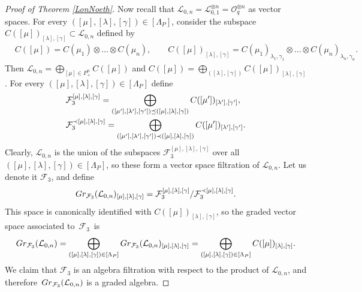 \documentclass[11pt]{article}
\numberwithin{equation}{section}
\numberwithin{equation}{section}
\theoremstyle{definition}
\newcommand{\Ll}{{\mathcal L}}
\begin{document}
\begin{proof}[Proof of Theorem \ref{LonNoeth}]
Now recall that $\Ll_{0,n} = {\mathcal L}_{0,1}^{\otimes n} = {\mathcal O}_q^{\otimes n}$ as vector spaces. For every $([\mu],[\lambda],[\gamma])\in[\Lambda_P]$, consider the subspace $C([\mu])_{[\lambda],[\gamma]}\subset \Ll_{0,n}$ defined by
\begin{align*}
&C([\mu]) =C(\mu_1)\otimes \dots \otimes C(\mu_n),\qquad
C([\mu])_{[\lambda],[\gamma]}=C(\mu_1)_{\lambda_1,\gamma_1}\otimes \dots \otimes C(\mu_n)_{\lambda_n,\gamma_n}.
\end{align*}
Then $ {\mathcal L}_{0,n}=\bigoplus_{[\mu]\in P_+^n} C({[\mu]})$ and $ C({[\mu]})=\bigoplus_{([\lambda],[\gamma])} C([\mu])_{[\lambda],[\gamma]}$. For every
$([\mu],[\lambda],[\gamma])\in [\Lambda_P]$ define
\begin{align}
&{\mathcal F}_3^{[\mu],[\lambda],[\gamma]} =\bigoplus_{([\mu'],[\lambda'],[\gamma'])\preceq ([\mu],[\lambda],[\gamma])} C([\mu'])_{[\lambda'],[\gamma']},\label{F2grad}\\
&{\mathcal F}_3^{\prec [\mu],[\lambda],[\gamma]} =\bigoplus_{([\mu'],[\lambda'],[\gamma'])\prec ([\mu],[\lambda],[\gamma])} C([\mu'])_{[\lambda'],[\gamma']}.\notag
\end{align}
Clearly, $\Ll_{0,n}$ is the union of the subspaces ${\mathcal F}_3^{[\mu],[\lambda],[\gamma]}$ over all $([\mu],[\lambda],[\gamma])\in [\Lambda_P]$, so these form a vector space filtration of $\Ll_{0,n}$. Let us denote it ${\mathcal F}_3$, and define
\[{\rm Gr}_{{\mathcal F}_3}({\mathcal L}_{0,n})_{[\mu],[\lambda],[\gamma]} = {\mathcal F}_3^{[\mu],[\lambda],[\gamma]}/{\mathcal F}_3^{\prec [\mu],[\lambda],[\gamma]}.\]
This space is canonically identified with $C({[\mu]})_{[\lambda],[\gamma]}$, so the graded vector space associated to~$\mathcal{F}_3$~is%
\begin{equation}\label{decompgrad}
{\rm Gr}_{{\mathcal F}_3}({\mathcal L}_{0,n}) = \bigoplus_{([\mu],[\lambda],[\gamma])\in [\Lambda_P]} {\rm Gr}_{{\mathcal F}_3}({\mathcal L}_{0,n})_{[\mu],[\lambda],[\gamma]} = \bigoplus_{([\mu],[\lambda],[\gamma])\in [\Lambda_P]} C({[\mu]})_{[\lambda],[\gamma]}.
\end{equation}
 We claim that ${\mathcal F}_3$ is an algebra filtration with respect to the product of $\Ll_{0,n}$, and therefore~${{\rm Gr}_{{\mathcal F}_3}({\mathcal L}_{0,n})}$ is a graded algebra.


\end{proof}
\end{document}
